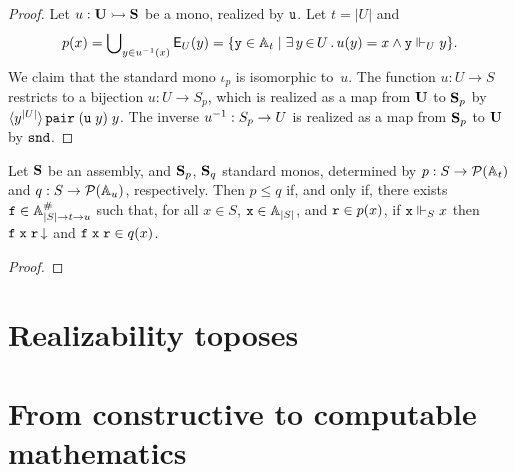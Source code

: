 \begin{proof}
  Let $u : \mathbf{U} \rightarrowtail \mathbf{S}$ be a mono, realized by $\mathtt{u}$.
  Let $t = |U|$ and
  \begin{equation*}
    p(x) = \bigcup\nolimits_{y \in {u}^{-1}(x)} \mathsf{E}_U(y) =
    \{\mathtt{y} \in \mathbb{A}_{t} \mid \exists\, y \,{\in}\, U\,.\,u(y) = x \land \mathtt{y} \Vdash_U y\}.
  \end{equation*}
  We claim that the standard mono $\iota_p$ is isomorphic to~$u$. The
  function $u : U \to S$ restricts to a bijection $u : U \to S_p$,
  which is realized as a map from $\mathbf{U}$ to $\mathbf{S}_p$ by
  $\langle y^{|U|} \rangle\,\mathtt{pair}\;(\mathtt{u}\;y)\;y$. The inverse
  ${u}^{-1} : S_p \to U$ is realized as a map from $\mathbf{S}_p$ to
  $\mathbf{U}$ by $\mathtt{snd}$.
\end{proof}

\begin{proposition}
  Let $\mathbf{S}$ be an assembly, and $\mathbf{S}_p$, $\mathbf{S}_q$ standard
  monos, determined by $p : S \to \mathcal{P}(\mathbb{A}_{t})$ and $q : S \to
  \mathcal{P}(\mathbb{A}_{u})$, respectively. Then $p \leq q$ if, and only if,
  there exists $\mathtt{f} \in \mathbb{A}^{\#}_{|S| \to t \to u}$ such that,
  for all $x \in S$, $\mathtt{x} \in \mathbb{A}_{|S|}$, and $\mathtt{r} \in p(x)$, if
  $\mathtt{x} \Vdash_S x$ then $\mathtt{f}\;\mathtt{x}\;\mathtt{r}\,{\downarrow}$ and
  $\mathtt{f}\;\mathtt{x}\;\mathtt{r} \in q(x)$.
\end{proposition}

\begin{proof}
  
\end{proof}


\section{Realizability toposes}
\label{sec:realizability-toposes}

\section{From constructive to computable mathematics}
\label{sec:constructive-math}



